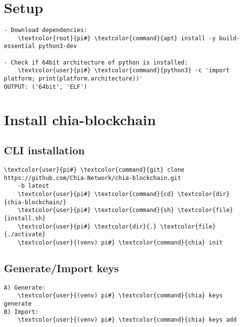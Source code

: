 \documentclass[10pt, a4paper, onecolumn, openany]{book} %
\begin{document}
\section{Setup}
\begin{Verbatim}[commandchars=\\\{\}]
- Download dependencies:
    \textcolor{root}{pi#} \textcolor{command}{apt} install -y build-essential python3-dev
    
- Check if 64bit architecture of python is installed:
    \textcolor{user}{pi#} \textcolor{command}{python3} -c 'import platform; print(platform.architecture))'
OUTPUT: ('64bit', 'ELF')
\end{Verbatim}

\section{Install chia-blockchain}
\subsection{CLI installation}
\begin{Verbatim}[commandchars=\\\{\}]
    \textcolor{user}{pi#} \textcolor{command}{git} clone https://github.com/Chia-Network/chia-blockchain.git
    -b latest
    \textcolor{user}{pi#} \textcolor{command}{cd} \textcolor{dir}{chia-blockchain/}
    \textcolor{user}{pi#} \textcolor{command}{sh} \textcolor{file}{install.sh}
    \textcolor{user}{pi#} \textcolor{dir}{.} \textcolor{file}{./activate}
    \textcolor{user}{(venv) pi#} \textcolor{command}{chia} init
\end{Verbatim}
\subsection{Generate/Import keys}
\begin{Verbatim}[commandchars=\\\{\}]
A) Generate:
    \textcolor{user}{(venv) pi#} \textcolor{command}{chia} keys generate
B) Import:
    \textcolor{user}{(venv) pi#} \textcolor{command}{chia} keys add
\end{Verbatim}
\end{document}
